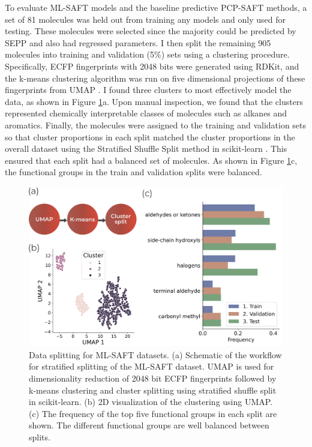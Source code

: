To evaluate ML-SAFT models and the baseline predictive PCP-SAFT methods, a set of 81 molecules was held out from training any models and only used for testing. These molecules were selected since the majority could be predicted by SEPP and also had regressed parameters. I then split the remaining 905 molecules into training and validation (5\%) sets using a clustering procedure. Specifically, ECFP fingerprints with 2048 bits were generated using RDKit, and the k-means clustering algorithm\cite{MacQueen1967} was run on five dimensional projections of these fingerprints from UMAP \cite{McInnes2018}. I found three clusters to most effectively model the data, as shown in Figure \ref{fig:splitting}a. Upon manual inspection, we found that the clusters represented chemically interpretable classes of molecules such as alkanes and aromatics. Finally, the molecules were assigned to the training and validation sets so that cluster proportions in each split matched the cluster proportions in the overall dataset using the Stratified Shuffle Split method in scikit-learn \cite{scikit-learn}. This ensured that each split had a balanced set of molecules. As shown in Figure \ref{fig:splitting}c, the functional groups in the train and validation splits were balanced. 

\begin{figure}
    \centering
    \includegraphics[width=\textwidth]{gfx/Chapter08/cluster_split.png}
    \caption{Data splitting for ML-SAFT datasets. (a) Schematic of the workflow for stratified splitting of the ML-SAFT dataset. UMAP\cite{McInnes2018} is used for dimensionality reduction of 2048 bit ECFP fingerprints followed by k-means clustering\cite{MacQueen1967} and cluster splitting using stratified shuffle split in scikit-learn.\cite{scikit-learn} (b) 2D visualization of the clustering using UMAP. (c) The frequency of the top five functional groups in each split are shown. The different functional groups are well balanced between splits.}
    \label{fig:splitting}
\end{figure}

